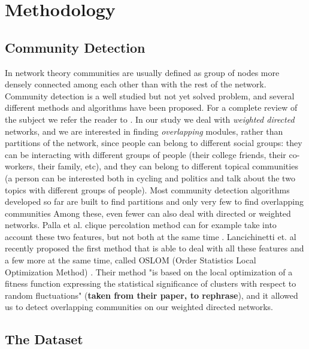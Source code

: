 \section{Methodology}

\subsection{Community Detection}

In network theory communities are usually defined as group of nodes more densely connected among each other than with the rest of the network. Community detection is a well studied but not yet solved problem, and several different methods and algorithms have been proposed. For a complete review of the subject we refer the reader to \cite{fortunato2010community}. In our study we deal with \textit{weighted directed} networks, and we are interested in finding \textit{overlapping} modules, rather than partitions of the network, since people can belong to different social groups: they can be interacting with different groups of people (their college friends, their co-workers, their family, etc), and they can belong to different topical communities (a person can be interested both in cycling and politics and talk about the two topics with different groups of people). Most community detection algorithms developed so far are built to find partitions and only very few to find overlapping communities \cite{newman2004finding,BaumesGKMP05,PalEtAl05,ZhaWanZha07,Gre07,PhysRevE.77.016107,Lancichinetti2009,PhysRevE.80.016105,Kovacs2010} Among these, even fewer can also deal with directed or weighted networks. Palla et al. clique percolation method can for example take into account these two features, but not both at the same time \cite{PalEtAl05}. Lancichinetti et. al recently proposed the first method that is able to deal with all these features and a few more at the same time, called OSLOM (Order Statistics Local Optimization Method) \cite{LancichinettiPlos}. Their method "is based on the local optimization of a fitness function expressing the statistical significance of clusters with respect to random fluctuations" (\textbf{taken from their paper, to rephrase}), and it allowed us to detect overlapping communities on our weighted directed networks.

\subsection{The Dataset}

